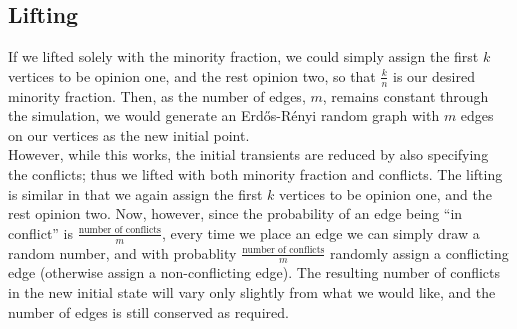 \documentclass[11pt]{article}
\begin{document}
\pagebreak

\subsection{Lifting}
\label{sec:lift}
If we lifted solely with the minority fraction, we could simply assign the first $k$ vertices to be opinion one, and the rest opinion two, so that $\frac{k}{n}$ is our desired minority fraction. Then, as the number of edges, $m$, remains constant through the simulation, we would generate an Erd\H{o}s-R\'{e}nyi random graph with $m$ edges on our vertices as the new initial point.  \\

However, while this works, the initial transients are reduced by also specifying the conflicts; thus we lifted with both minority fraction and conflicts. The lifting is similar in that we again assign the first $k$ vertices to be opinion one, and the rest opinion two. Now, however, since the probability of an edge being ``in conflict'' is $\frac{\textrm{number of conflicts}}{m}$, every time we place an edge we can simply draw a random number, and with probablity $\frac{\textrm{number of conflicts}}{m}$ randomly assign a conflicting edge (otherwise assign a non-conflicting edge). The resulting number of conflicts in the new initial state will vary only slightly from what we would like, and the number of edges is still conserved as required.
\end{document}
